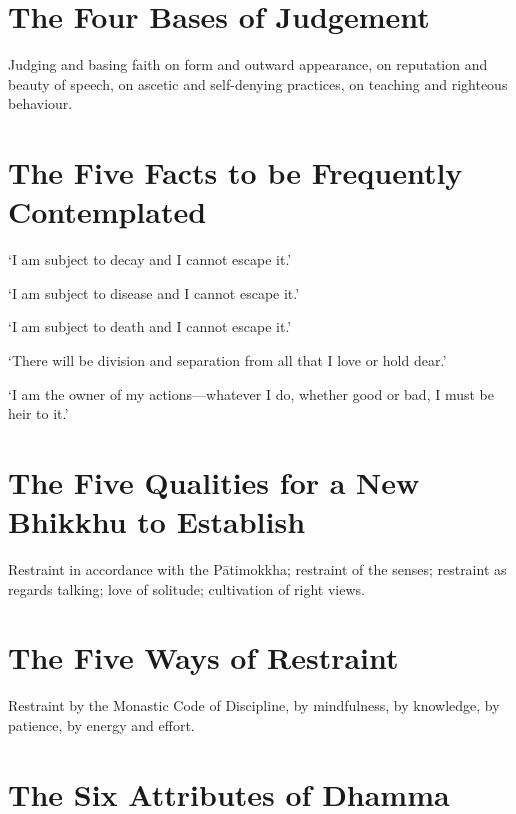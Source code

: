 
\section{The Four Bases of Judgement}

Judging and basing faith on form and outward appearance, on reputation and
beauty of speech, on ascetic and self-denying practices, on teaching and
righteous behaviour.


\section{The Five Facts to be Frequently Contemplated}

‘I am subject to decay and I cannot escape it.’

‘I am subject to disease and I cannot escape it.’

‘I am subject to death and I cannot escape it.’

‘There will be division and separation from all that I love or hold dear.’

‘I am the owner of my actions—whatever I do, whether good or bad, I must be heir
to it.’


\section[The Five Qualities for a New Bhikkhu]{The Five Qualities for a New Bhikkhu to Establish}

Restraint in accordance with the Pātimokkha; restraint of the senses; restraint
as regards talking; love of solitude; cultivation of right views.


\section{The Five Ways of Restraint}

Restraint by the Monastic Code of Discipline, by mindfulness, by knowledge, by
patience, by energy and effort.


\section{The Six Attributes of Dhamma}

